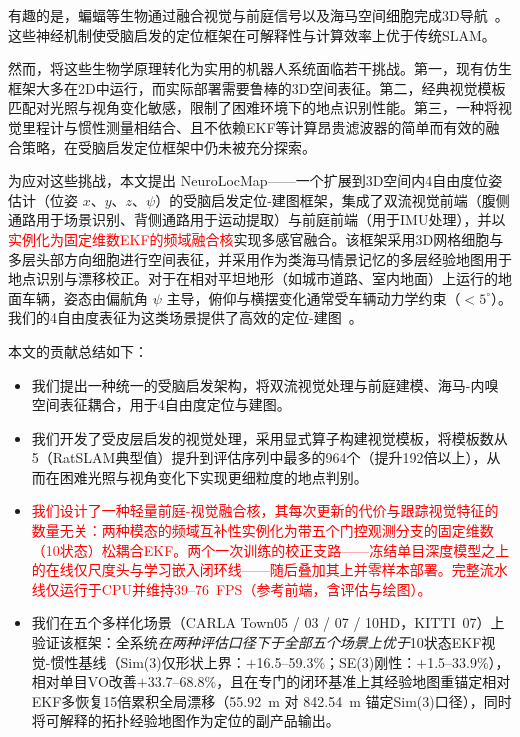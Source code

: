 \documentclass[review,12pt]{elsarticle}
\begin{document}
有趣的是，蝙蝠等生物通过融合视觉与前庭信号以及海马空间细胞完成3D导航~\cite{jeffery2013navigating,hafting2005microstructure,taube1990head,finkelstein2016three,solstad2008representation}。这些神经机制使受脑启发的定位框架在可解释性与计算效率上优于传统SLAM。

然而，将这些生物学原理转化为实用的机器人系统面临若干挑战。第一，现有仿生框架大多在2D中运行，而实际部署需要鲁棒的3D空间表征。第二，经典视觉模板匹配对光照与视角变化敏感，限制了困难环境下的地点识别性能。第三，一种将视觉里程计与惯性测量相结合、且不依赖EKF等计算昂贵滤波器的简单而有效的融合策略，在受脑启发定位框架中仍未被充分探索。

为应对这些挑战，本文提出 NeuroLocMap——一个扩展到3D空间内4自由度位姿估计（位姿 $x$、$y$、$z$、$\psi$）的受脑启发定位-建图框架，集成了双流视觉前端（腹侧通路用于场景识别、背侧通路用于运动提取）与前庭前端（用于IMU处理），并以\textcolor{red}{实例化为固定维数EKF的频域融合核}实现多感官融合。该框架采用3D网格细胞与多层头部方向细胞进行空间表征，并采用作为类海马情景记忆的多层经验地图用于地点识别与漂移校正。对于在相对平坦地形（如城市道路、室内地面）上运行的地面车辆，姿态由偏航角 $\psi$ 主导，俯仰与横摆变化通常受车辆动力学约束（$<5^\circ$）。我们的4自由度表征为这类场景提供了高效的定位-建图~\cite{milford2004ratslam,milford2010persistent}。

本文的贡献总结如下：
\begin{itemize}
    \item 我们提出一种统一的受脑启发架构，将双流视觉处理与前庭建模、海马-内嗅空间表征耦合，用于4自由度定位与建图。
    \item 我们开发了受皮层启发的视觉处理，采用显式算子构建视觉模板，将模板数从5（RatSLAM典型值）提升到评估序列中最多的964个（提升192倍以上），从而在困难光照与视角变化下实现更细粒度的地点判别。
    \item \textcolor{red}{我们设计了一种轻量前庭-视觉融合核，其每次更新的代价与跟踪视觉特征的数量无关：两种模态的频域互补性实例化为带五个门控观测分支的固定维数（10状态）松耦合EKF。两个一次训练的校正支路——冻结单目深度模型之上的在线仅尺度头与学习嵌入闭环线——随后叠加其上并零样本部署。完整流水线仅运行于CPU并维持39--76~FPS（参考前端，含评估与绘图）。}
    \item 我们在五个多样化场景（CARLA Town05 / 03 / 07 / 10HD，KITTI~07）上验证该框架：全系统\emph{在两种评估口径下于全部五个场景上优于}10状态EKF视觉-惯性基线（Sim(3)仅形状上界：$+$16.5--59.3\%；SE(3)刚性：$+$1.5--33.9\%），相对单目VO改善$+$33.7--68.8\%，且在专门的闭环基准上其经验地图重锚定相对EKF多恢复15倍累积全局漂移（55.92~m 对 842.54~m 锚定Sim(3)口径），同时将可解释的拓扑经验地图作为定位的副产品输出。
\end{itemize}
\end{document}

